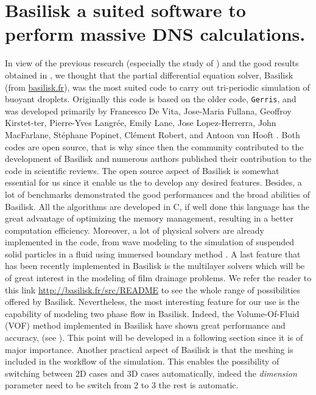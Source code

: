 \section{Basilisk a suited software to perform massive DNS calculations.}

In view of the previous research (especially the study of \citet{innocenti2020direct}) and the good results obtained in \citet{Naanouh2021numerical}, we thought that the partial differential equation solver, Basilisk (from \url{basilisk.fr}), was the most suited code to carry out tri-periodic simulation of buoyant droplets. 
Originally this code is based on the older code,  \texttt{Gerris}, and was developed primarily by Francesco De Vita, Jose-Maria Fullana, Geoffroy Kirstet-ter, Pierre-Yves Langrée, Emily Lane, Jose Lopez-Herrerra, John MacFarlane, Stéphane Popinet, Clément Robert, and Antoon van Hooft .
Both codes are open source, that is why since then the community contributed to the development of Basilisk and numerous authors published their contribution to the code in scientific reviews.
The open source aspect of Basilisk is somewhat essential for us since it enable us the to develop any desired features.
Besides, a lot of benchmarks demonstrated the good performances and the broad abilities of Basilisk.
All the algorithms are developed in C, if well done this language has the great advantage of optimizing the memory management, resulting in a better computation efficiency. 
Moreover, a lot of physical solvers are already implemented in the code, from wave modeling \citet{mostert2022high} to the simulation of suspended solid particles in a fluid using immersed boundary method \citet{shui2015direct}.
A last feature that has been recently implemented in Basilisk is the multilayer solvers \citep{popinet2020vertically} which will be of great interest in the modeling of film drainage problems. 
We refer the reader to this link \url{http://basilisk.fr/src/README} to see the whole range of possibilities offered by Basilisk.
Nevertheless, the most interesting feature for our use is the capability of modeling two phase flow in Basilisk. 
Indeed, the Volume-Of-Fluid (VOF) method implemented in Basilisk have shown great performance and accuracy, (see \citet{popinet2009accurate}\citet{popinet2018numerical}). 
This point will be developed in a following section since it is of major importance. 
Another practical aspect of Basilisk is that the meshing is included in the workflow of the simulation. 
This enables the possibility of switching between 2D cases and 3D cases automatically, indeed the \textit{dimension} parameter need to be switch from 2 to 3 the rest is automatic. 
